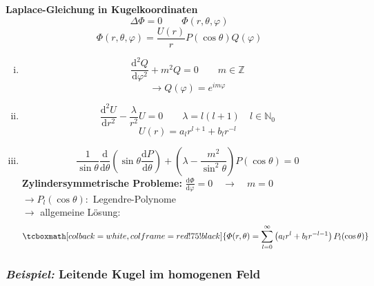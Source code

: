 \documentclass[titlepage,11pt,a4paper,ngerman]{report}
\newcommand{\tx}[1]{\textrm{#1}}
\newcommand{\prd}[2]{\frac{\tx{d} #1}{\tx{d} #2}}
\renewcommand{\Phi}{\varPhi}
\newcommand{\rmbox}[1]{\tcboxmath[colback=white,colframe=red!75!black]{#1}}
\newcommand{\bbb}[2]{\begin{tcolorbox}[colback=white,colframe=black,fonttitle=\bfseries,title=#1,sharp corners,tcbox raise base]#2\end{tcolorbox}}
\begin{document}
\bbb{Wiederholung}{
\textbf{Laplace-Gleichung in Kugelkoordinaten}
\begin{equation*}
\Delta \Phi = 0 \qquad \Phi(r,\theta,\varphi)
\end{equation*}
\begin{equation*}
\Phi(r,\theta,\varphi) = \frac{U(r)}{r} P(\cos\theta) Q(\varphi)
\end{equation*}
\begin{enumerate}[i)]
	\item \begin{equation*}
	\prd{^2Q}{\varphi^2} + m^2 Q = 0 \qquad m \in \mathbb{Z}
	\end{equation*}
	\begin{equation*}
	\rightarrow Q(\varphi) = e ^{i m \varphi}
	\end{equation*}
	\item \begin{equation*}
	\prd{^2 U}{r^2} - \frac{\lambda}{r^2} U = 0 \qquad \lambda = l (l+1) \quad l \in \mathbb{N}_0
	\end{equation*}
	\begin{equation*}
	U(r) = a_l r^{l+1} + b_l r^{-l}
	\end{equation*}
	\item \begin{equation*}
	\frac{1}{\sin \theta} \prd{}{\theta} \left(\sin \theta \prd{P}{\theta} \right) + \left(\lambda - \frac{m^2}{\sin^2 \theta}\right) P(\cos\theta) = 0
	\end{equation*}
	\textbf{Zylindersymmetrische Probleme:}
	$ \prd{\Phi}{\varphi} = 0 \quad \rightarrow \quad m = 0 $\\
	$ \rightarrow P_l(\cos\theta) : $ Legendre-Polynome\\
	$ \rightarrow $ allgemeine Lösung:
	\begin{equation*}
	\rmbox{\Phi(r,\theta) = \sum_{l=0}^{\infty} \left(a_l r^l + b_l r^{-l-1}\right) P_l(\cos\theta)}
	\end{equation*}
\end{enumerate}
}
\noindent
\subsubsection{\emph{Beispiel:} \textbf{Leitende Kugel im homogenen Feld}}
\end{document}
